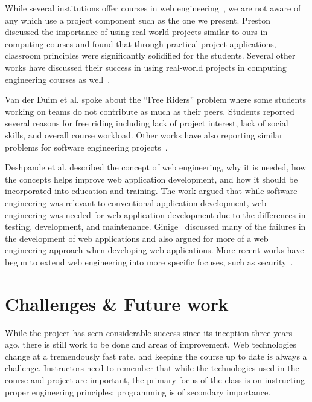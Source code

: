\documentclass{sig-alternate}
\begin{document}
While several institutions offer courses in web engineering~\cite{tufts_webengineering,csun_webengineering}, we are not aware of any which use a project component such as the one we present. Preston~\cite{Preston:2005:UAR:1869667.1869671} discussed the importance of using real-world projects similar to ours in computing courses and found that through practical project applications, classroom principles were significantly solidified for the students. Several other works have discussed their success in using real-world projects in computing engineering courses as well~\cite{Krutz:2014:URW:2538862.2538955, MacKellar:2011:SEC:1968521.1968542, Nordio:2011:TSE:1984665.1984673}.

Van der Duim et al.\cite{VanderDuim:2007:GPE:1248820.1248900} spoke about the ``Free Riders'' problem where some students working on teams do not contribute as much as their peers. Students reported several reasons for free riding including lack of project interest, lack of social skills, and overall course workload. Other works have also reporting similar problems for software engineering projects~\cite{RePEc:dgr:rugsom:03a42,Hazzan03teachinga}.

Deshpande et al.\cite{Deshpande:2002:WE:2011098.2011101} described the concept of web engineering, why it is needed, how the concepts helps improve web application development, and how it should be incorporated into education and training. The work argued that while software engineering was relevant to conventional application development, web engineering was needed for web application development due to the differences in testing, development, and maintenance. Ginige~\cite{Ginige:2002:WEM:568760.568885} discussed many of the failures in the development of web applications and also argued for more of a web engineering approach when developing web applications. More recent works have begun to extend web engineering into more specific focuses, such as security~\cite{Aljawarneh201112}.

\section{Challenges \& Future work}
\label{sec: futurework}

While the project has seen considerable success since its inception three years ago, there is still work to be done and areas of improvement. Web technologies change at a tremendously fast rate, and keeping the course up to date is always a challenge. Instructors need to remember that while the technologies used in the course and project are important, the primary focus of the class is on instructing proper engineering principles; programming is of secondary importance.
\end{document}
